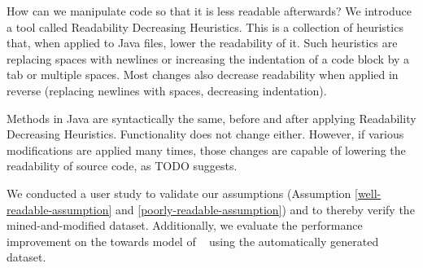 \documentclass[%
class=scrreprt,
chapterprefix=false,%
open=right,%
twoside=false,%
paper=a4,%
logofile={Logo\_zentral\_farbig\_EN.png},%
thesistype=master,%
UKenglish,%
]{se2thesis}
\newcounter{urlfootnote}
\newcommand{\onecurl}[2]{%
	\stepcounter{urlfootnote}%
	\expandafter\def\csname urlfootnote:#1\endcsname{\theurlfootnote}%
	\footnote{\label{url:#1}\url{#1}, accessed: #2}%
}
\newcommand{\curl}[2]{%
	\ifcsdef{urlfootnote:#1}{%
		\textsuperscript{\ref{url:#1}}%
	}{%
		\onecurl{#1}{#2}%
	}%
}
\theoremstyle{definition}
\newcommand{\citeolddataset}{\cite{buse2009learning, dorn2012general, scalabrino2018comprehensive}}
\begin{document}
	How can we manipulate code so that it is less readable afterwards? We introduce a tool called Readability Decreasing Heuristics. This is a collection of heuristics that, when applied to Java files, lower the readability of it. Such heuristics are replacing spaces with newlines or increasing the indentation of a code block by a tab or multiple spaces. Most changes also decrease readability when applied in reverse (replacing newlines with spaces, decreasing indentation).
	
	Methods in Java are syntactically the same, before and after applying Readability Decreasing Heuristics. Functionality does not change either. However, if various modifications are applied many times, those changes are capable of lowering the readability of source code, as TODO suggests.

%	

	We conducted a user study to validate our assumptions (Assumption \ref{well-readable-assumption} and \ref{poorly-readable-assumption}) and to thereby verify the mined-and-modified dataset.
	Additionally, we evaluate the performance improvement on the towards model of \citeauthor{mi2022towards}~\cite{mi2022towards} using the automatically generated dataset.
		
\end{document}
